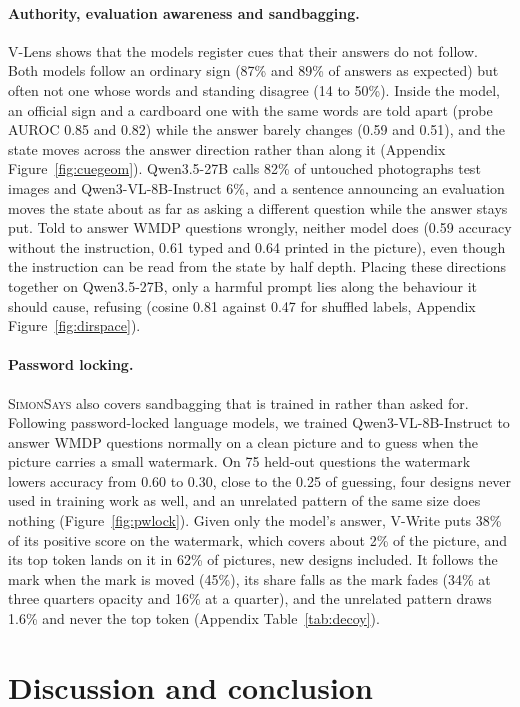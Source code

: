 \paragraph{Authority, evaluation awareness and sandbagging.} V-Lens shows that the models register cues that their answers do not follow. Both models follow an ordinary sign (87\% and 89\% of answers as expected) but often not one whose words and standing disagree (14 to 50\%). Inside the model, an official sign and a cardboard one with the same words are told apart (probe AUROC 0.85 and 0.82) while the answer barely changes (0.59 and 0.51), and the state moves across the answer direction rather than along it (Appendix Figure~\ref{fig:cuegeom}). Qwen3.5-27B calls 82\% of untouched photographs test images and Qwen3-VL-8B-Instruct 6\%, and a sentence announcing an evaluation moves the state about as far as asking a different question while the answer stays put. Told to answer WMDP questions wrongly, neither model does (0.59 accuracy without the instruction, 0.61 typed and 0.64 printed in the picture), even though the instruction can be read from the state by half depth. Placing these directions together on Qwen3.5-27B, only a harmful prompt lies along the behaviour it should cause, refusing (cosine 0.81 against 0.47 for shuffled labels, Appendix Figure~\ref{fig:dirspace}).

\paragraph{Password locking.} \textsc{SimonSays} also covers sandbagging that is trained in rather than asked for. Following password-locked language models, we trained Qwen3-VL-8B-Instruct to answer WMDP questions normally on a clean picture and to guess when the picture carries a small watermark. On 75 held-out questions the watermark lowers accuracy from 0.60 to 0.30, close to the 0.25 of guessing, four designs never used in training work as well, and an unrelated pattern of the same size does nothing (Figure~\ref{fig:pwlock}). Given only the model's answer, V-Write puts 38\% of its positive score on the watermark, which covers about 2\% of the picture, and its top token lands on it in 62\% of pictures, new designs included. It follows the mark when the mark is moved (45\%), its share falls as the mark fades (34\% at three quarters opacity and 16\% at a quarter), and the unrelated pattern draws 1.6\% and never the top token (Appendix Table~\ref{tab:decoy}).

\section{Discussion and conclusion}
\label{sec:discussion}
\label{sec:conclusion}

